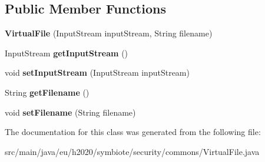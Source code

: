 \subsection*{Public Member Functions}
\begin{DoxyCompactItemize}
\item 
{\bfseries Virtual\+File} (Input\+Stream input\+Stream, String filename)\hypertarget{classeu_1_1h2020_1_1symbiote_1_1security_1_1commons_1_1VirtualFile_a4f3c734a8179a11e127ae2ed1ff93843}{}\label{classeu_1_1h2020_1_1symbiote_1_1security_1_1commons_1_1VirtualFile_a4f3c734a8179a11e127ae2ed1ff93843}

\item 
Input\+Stream {\bfseries get\+Input\+Stream} ()\hypertarget{classeu_1_1h2020_1_1symbiote_1_1security_1_1commons_1_1VirtualFile_ab8e51b0bafbe996f641576d91d4ce2a8}{}\label{classeu_1_1h2020_1_1symbiote_1_1security_1_1commons_1_1VirtualFile_ab8e51b0bafbe996f641576d91d4ce2a8}

\item 
void {\bfseries set\+Input\+Stream} (Input\+Stream input\+Stream)\hypertarget{classeu_1_1h2020_1_1symbiote_1_1security_1_1commons_1_1VirtualFile_a176717db92b70b7b611cf3e93b2dfe49}{}\label{classeu_1_1h2020_1_1symbiote_1_1security_1_1commons_1_1VirtualFile_a176717db92b70b7b611cf3e93b2dfe49}

\item 
String {\bfseries get\+Filename} ()\hypertarget{classeu_1_1h2020_1_1symbiote_1_1security_1_1commons_1_1VirtualFile_a6d4312b65690866f053b14802d5b4d91}{}\label{classeu_1_1h2020_1_1symbiote_1_1security_1_1commons_1_1VirtualFile_a6d4312b65690866f053b14802d5b4d91}

\item 
void {\bfseries set\+Filename} (String filename)\hypertarget{classeu_1_1h2020_1_1symbiote_1_1security_1_1commons_1_1VirtualFile_a2f094abc06a506737d6534f4d2f051d6}{}\label{classeu_1_1h2020_1_1symbiote_1_1security_1_1commons_1_1VirtualFile_a2f094abc06a506737d6534f4d2f051d6}

\end{DoxyCompactItemize}


The documentation for this class was generated from the following file\+:\begin{DoxyCompactItemize}
\item 
src/main/java/eu/h2020/symbiote/security/commons/Virtual\+File.\+java\end{DoxyCompactItemize}
